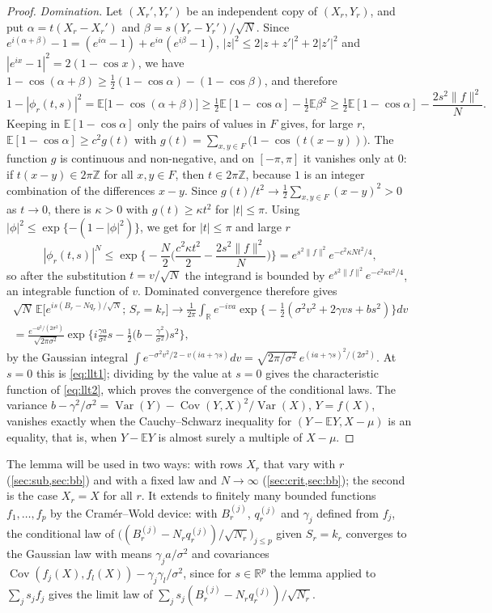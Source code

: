 \documentclass[11pt]{amsart}
\theoremstyle{definition}
\newcommand{\R}{\mathbb{R}}
\newcommand{\Z}{\mathbb{Z}}
\newcommand{\E}{\mathbb{E}}
\DeclareMathOperator{\Var}{Var}
\DeclareMathOperator{\Cov}{Cov}
\begin{document}
\begin{proof}
\emph{Domination.} Let $(X_r',Y_r')$ be an independent copy of $(X_r,Y_r)$, and put $\alpha=t(X_r-X_r')$ and $\beta=s(Y_r-Y_r')/\sqrt N$. Since $e^{i(\alpha+\beta)}-1=(e^{i\alpha}-1)+e^{i\alpha}(e^{i\beta}-1)$, $|z|^2\le2|z+z'|^2+2|z'|^2$ and $|e^{ix}-1|^2=2(1-\cos x)$, we have $1-\cos(\alpha+\beta)\ge\frac12(1-\cos\alpha)-(1-\cos\beta)$, and therefore
\[
1-|\phi_r(t,s)|^2=\E\big[1-\cos(\alpha+\beta)\big]\ge\tfrac12\E[1-\cos\alpha]-\tfrac12\E\beta^2\ge\tfrac12\E[1-\cos\alpha]-\frac{2s^2\|f\|^2}N.
\]
Keeping in $\E[1-\cos\alpha]$ only the pairs of values in $F$ gives, for large $r$, $\E[1-\cos\alpha]\ge c^2g(t)$ with $g(t)=\sum_{x,y\in F}\big(1-\cos(t(x-y))\big)$. The function $g$ is continuous and non-negative, and on $[-\pi,\pi]$ it vanishes only at $0$: if $t(x-y)\in2\pi\Z$ for all $x,y\in F$, then $t\in2\pi\Z$, because $1$ is an integer combination of the differences $x-y$. Since $g(t)/t^2\to\frac12\sum_{x,y\in F}(x-y)^2>0$ as $t\to0$, there is $\kappa>0$ with $g(t)\ge\kappa t^2$ for $|t|\le\pi$. Using $|\phi|^2\le\exp\{-(1-|\phi|^2)\}$, we get for $|t|\le\pi$ and large $r$
\[
|\phi_r(t,s)|^N\le\exp\Big\{-\frac N2\Big(\frac{c^2\kappa t^2}2-\frac{2s^2\|f\|^2}N\Big)\Big\}=e^{s^2\|f\|^2}e^{-c^2\kappa Nt^2/4},
\]
so after the substitution $t=v/\sqrt N$ the integrand is bounded by $e^{s^2\|f\|^2}e^{-c^2\kappa v^2/4}$, an integrable function of $v$. Dominated convergence therefore gives
\begin{multline*}
\sqrt N\,\E\Big[e^{is(B_r-Nq_r)/\sqrt N};\,S_r=k_r\Big]
\longrightarrow\frac1{2\pi}\int_\R e^{-iva}\exp\Big\{-\tfrac12(\sigma^2v^2+2\gamma vs+bs^2)\Big\}dv\\
=\frac{e^{-a^2/(2\sigma^2)}}{\sqrt{2\pi\sigma^2}}\exp\Big\{i\frac{\gamma a}{\sigma^2}s-\frac12\Big(b-\frac{\gamma^2}{\sigma^2}\Big)s^2\Big\},
\end{multline*}
by the Gaussian integral $\int e^{-\sigma^2v^2/2-v(ia+\gamma s)}dv=\sqrt{2\pi/\sigma^2}\,e^{(ia+\gamma s)^2/(2\sigma^2)}$. At $s=0$ this is \eqref{eq:llt1}; dividing by the value at $s=0$ gives the characteristic function of \eqref{eq:llt2}, which proves the convergence of the conditional laws. The variance $b-\gamma^2/\sigma^2=\Var(Y)-\Cov(Y,X)^2/\Var(X)$, $Y=f(X)$, vanishes exactly when the Cauchy--Schwarz inequality for $(Y-\E Y,X-\mu)$ is an equality, that is, when $Y-\E Y$ is almost surely a multiple of $X-\mu$.
\end{proof}

The lemma will be used in two ways: with rows $X_r$ that vary with $r$ (\cref{sec:sub,sec:bb}) and with a fixed law and $N\to\infty$ (\cref{sec:crit,sec:bb}); the second is the case $X_r=X$ for all $r$. It extends to finitely many bounded functions $f_1,\dots,f_p$ by the Cram\'er--Wold device: with $B_r^{(j)}$, $q_r^{(j)}$ and $\gamma_j$ defined from $f_j$, the conditional law of $\big((B_r^{(j)}-N_rq_r^{(j)})/\sqrt{N_r}\big)_{j\le p}$ given $S_r=k_r$ converges to the Gaussian law with means $\gamma_ja/\sigma^2$ and covariances $\Cov(f_j(X),f_l(X))-\gamma_j\gamma_l/\sigma^2$, since for $s\in\R^p$ the lemma applied to $\sum_js_jf_j$ gives the limit law of $\sum_js_j(B_r^{(j)}-N_rq_r^{(j)})/\sqrt{N_r}$.
\end{document}
